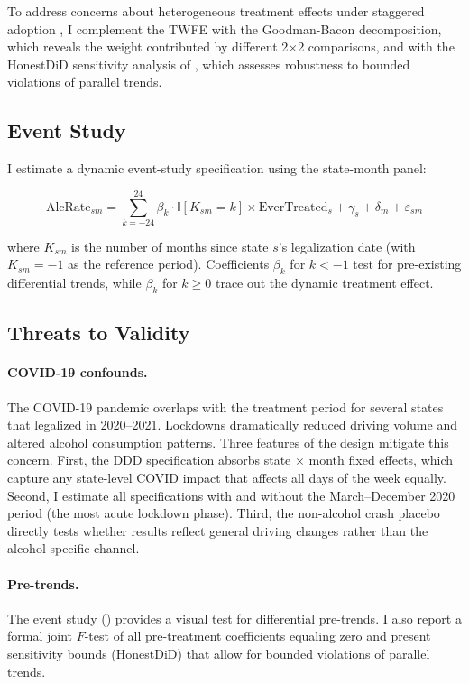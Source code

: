 \documentclass[12pt]{article}
\newcommand{\ind}{\mathbb{I}}
\begin{document}
To address concerns about heterogeneous treatment effects under staggered adoption \citep{dechaisemartin2020two, sunabraham2021estimating, borusyak2024revisiting}, I complement the TWFE with the Goodman-Bacon decomposition, which reveals the weight contributed by different 2$\times$2 comparisons, and with the HonestDiD sensitivity analysis of \citet{rambachan2023more}, which assesses robustness to bounded violations of parallel trends.

\subsection{Event Study}

I estimate a dynamic event-study specification using the state-month panel:

\begin{equation}
\text{AlcRate}_{sm} = \sum_{k=-24}^{24} \beta_k \cdot \ind[K_{sm} = k] \times \text{EverTreated}_s + \gamma_s + \delta_m + \varepsilon_{sm}
\label{eq:eventstudy}
\end{equation}

\noindent where $K_{sm}$ is the number of months since state $s$'s legalization date (with $K_{sm} = -1$ as the reference period). Coefficients $\beta_k$ for $k < -1$ test for pre-existing differential trends, while $\beta_k$ for $k \geq 0$ trace out the dynamic treatment effect.

\subsection{Threats to Validity}

\paragraph{COVID-19 confounds.} The COVID-19 pandemic overlaps with the treatment period for several states that legalized in 2020--2021. Lockdowns dramatically reduced driving volume and altered alcohol consumption patterns. Three features of the design mitigate this concern. First, the DDD specification absorbs state $\times$ month fixed effects, which capture any state-level COVID impact that affects all days of the week equally. Second, I estimate all specifications with and without the March--December 2020 period (the most acute lockdown phase). Third, the non-alcohol crash placebo directly tests whether results reflect general driving changes rather than the alcohol-specific channel.

\paragraph{Pre-trends.} The event study () provides a visual test for differential pre-trends. I also report a formal joint $F$-test of all pre-treatment coefficients equaling zero and present \citet{rambachan2023more} sensitivity bounds (HonestDiD) that allow for bounded violations of parallel trends.
\end{document}
